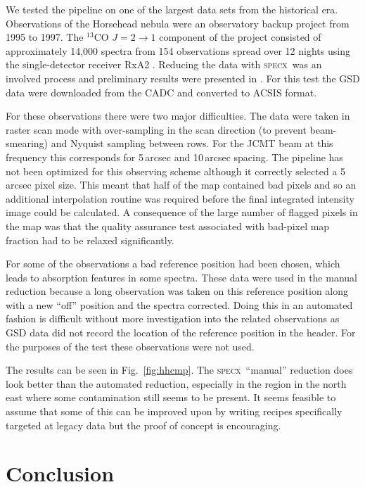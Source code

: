 \documentclass[a4paper,fleqn,usenatbib]{mnras}
\newcommand{\specx}{\textsc{specx}}
\begin{document}
We tested the pipeline on one of the largest data sets from the
historical era. Observations of the Horsehead nebula were an
observatory backup project from 1995 to 1997. The $^{13}$CO
$J=2\rightarrow 1$ component of the project consisted of approximately
14,000 spectra from 154 observations spread over 12 nights using the
single-detector receiver RxA2 \citep{1992IJIMW..13..647D}. Reducing
the data with \specx\ was an involved process and preliminary results
were presented in \citet{2001AAS...19915601S}. For this test the GSD data were
downloaded from the CADC and converted to ACSIS format.

For these observations there were two major difficulties. The data
were taken in raster scan mode with over-sampling in the scan
direction (to prevent beam-smearing) and Nyquist sampling between
rows. For the JCMT beam at this frequency this corresponds for
5\,arcsec and 10\,arcsec spacing. The pipeline has not been optimized
for this observing scheme although it correctly selected a 5\,arcsec
pixel size. This meant that half of the map contained bad pixels and
so an additional interpolation routine was required before the final
integrated intensity image could be calculated. A consequence of the
large number of flagged pixels in the map was that the quality
assurance test associated with bad-pixel map fraction had to be
relaxed significantly.

For some of the observations a bad reference position had been chosen,
which leads to absorption features in some spectra. These data were
used in the manual reduction because a long observation was taken on
this reference position along with a new ``off'' position and the
spectra corrected. Doing this in an automated fashion is difficult
without more investigation into the related observations as GSD data
did not record the location of the reference position in the
header. For the purposes of the test these observations were not used.

The results can be seen in Fig.\ \ref{fig:hhcmp}. The \specx\ ``manual''
reduction does look better than the automated reduction, especially in
the region in the north east where some contamination still seems to
be present. It seems feasible to assume that some of this can be
improved upon by writing recipes specifically targeted at legacy data
but the proof of concept is encouraging.

\section{Conclusion}
\end{document}
